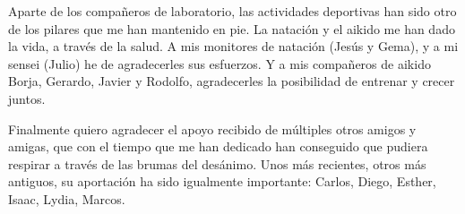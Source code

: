 Aparte de los compañeros de laboratorio, las actividades deportivas han sido
otro de los pilares que me han mantenido en pie. La natación y el aikido me han
dado la vida, a través de la salud. A mis monitores de natación (Jesús y Gema),
y a mi sensei (Julio) he de agradecerles sus esfuerzos. Y a mis compañeros de
aikido Borja, Gerardo, Javier y Rodolfo, agradecerles la posibilidad de entrenar
y crecer juntos.

Finalmente quiero agradecer el apoyo recibido de múltiples otros amigos y
amigas, que con el tiempo que me han dedicado han conseguido que pudiera
respirar a través de las brumas del desánimo. Unos más recientes, otros más
antiguos, su aportación ha sido igualmente importante: Carlos, Diego, Esther,
Isaac, Lydia, Marcos.
